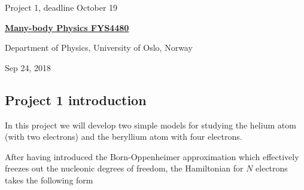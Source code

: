 \documentclass[%
oneside,                 %
final,                   %
10pt]{article}
\begin{document}

\newcommand{\exercisesection}[1]{\subsection*{#1}}







\thispagestyle{empty}

\begin{center}
{\LARGE\bf
\begin{spacing}{1.25}
Project 1, deadline  October 19
\end{spacing}
}
\end{center}


\begin{center}
{\bf \href{{http://www.uio.no/studier/emner/matnat/fys/FYS4480/index-eng.html}}{Many-body Physics FYS4480}}
\end{center}

    \begin{center}
\centerline{{\small Department of Physics, University of Oslo, Norway}}
\end{center}
    

\begin{center}
Sep 24, 2018
\end{center}

\vspace{1cm}


\subsection*{Project 1 introduction}

In this project we will develop two simple models for studying the 
helium atom (with two electrons) and the beryllium atom with four electrons.

After having introduced the  Born-Oppenheimer approximation which effectively freezes out the nucleonic degrees
of freedom, the Hamiltonian for $N$ electrons takes the following form
\end{document}
